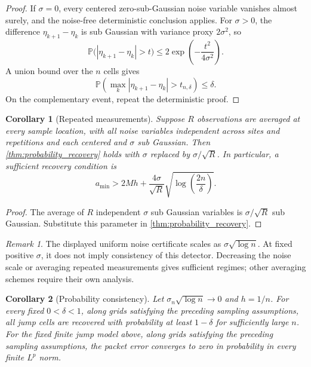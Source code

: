 \documentclass{aomart}
\newtheorem{corollary}[corollary]{Corollary}
\theoremstyle{definition}
\theoremstyle{remark}
\newtheorem{remark}[remark]{Remark}
\begin{document}
\begin{proof}
If \(\sigma=0\), every centered zero-sub-Gaussian noise variable vanishes almost surely, and the noise-free deterministic conclusion applies. For \(\sigma>0\), the difference \(\eta_{k+1}-\eta_k\) is sub Gaussian with variance proxy \(2\sigma^2\), so
\[
\mathbb P\bigl(|\eta_{k+1}-\eta_k|>t\bigr)
\leq
2\exp\left(-\frac{t^2}{4\sigma^2}\right).
\]
A union bound over the \(n\) cells gives
\[
\mathbb P\left(
\max_k|\eta_{k+1}-\eta_k|>t_{n,\delta}
\right)
\leq
\delta.
\]
On the complementary event, repeat the deterministic proof.
\end{proof}

\begin{corollary}[Repeated measurements]\label{cor:repeated_measurements}
Suppose \(R\) observations are averaged at every sample location, with all noise variables independent across sites and repetitions and each centered and \(\sigma\) sub Gaussian. Then \cref{thm:probability_recovery} holds with \(\sigma\) replaced by \(\sigma/\sqrt R\). In particular, a sufficient recovery condition is
\[
a_{\min}
>
2Mh+
\frac{4\sigma}{\sqrt R}
\sqrt{\log\left(\frac{2n}{\delta}\right)}.
\]
\end{corollary}

\begin{proof}
The average of \(R\) independent \(\sigma\) sub Gaussian variables is \(\sigma/\sqrt R\) sub Gaussian. Substitute this parameter in \cref{thm:probability_recovery}.
\end{proof}

\begin{remark}\label{rem:noise_scaling}
The displayed uniform noise certificate scales as \(\sigma\sqrt{\log n}\). At fixed positive \(\sigma\), it does not imply consistency of this detector. Decreasing the noise scale or averaging repeated measurements gives sufficient regimes; other averaging schemes require their own analysis.
\end{remark}

\begin{corollary}[Probability consistency]\label{cor:probability_consistency}
Let \(\sigma_n\sqrt{\log n}\to0\) and \(h=1/n\). For every fixed \(0<\delta<1\), along grids satisfying the preceding sampling assumptions, all jump cells are recovered with probability at least \(1-\delta\) for sufficiently large \(n\). For the fixed finite jump model above, along grids satisfying the preceding sampling assumptions, the packet error converges to zero in probability in every finite \(L^p\) norm.
\end{corollary}
\end{document}
